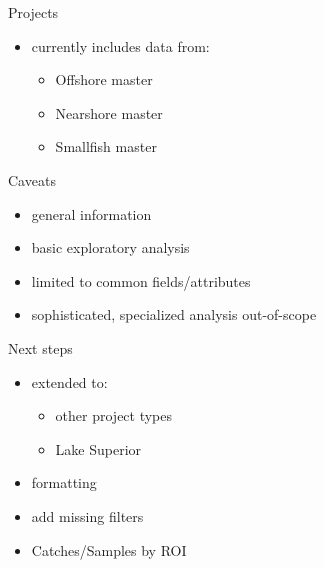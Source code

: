 \documentclass[presentation, smaller]{beamer}
\begin{document}
\begin{frame}[label=sec-5]{Projects}
\begin{itemize}
\item currently includes data from:
\begin{itemize}
\item Offshore master
\item Nearshore master
\item Smallfish master
\end{itemize}
\end{itemize}
\end{frame}

\begin{frame}[label=sec-6]{Caveats}
\begin{itemize}
\item general information
\item basic exploratory analysis
\item limited to common fields/attributes
\item sophisticated, specialized analysis out-of-scope
\end{itemize}
\end{frame}

\begin{frame}[label=sec-7]{Next steps}
\begin{itemize}
\item extended to:
\begin{itemize}
\item other project types
\item Lake Superior
\end{itemize}
\item formatting
\item add missing filters
\item Catches/Samples by ROI
\end{itemize}
\end{frame}
\end{document}
